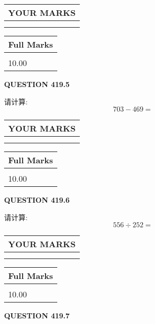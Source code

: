 \documentclass{ctexart}
\begin{document}
 
  
\vspace{0.2in}
  
\noindent\begin{tabular}{|l|}
\hline
 YOUR MARKS  \\
\hline
 \\ 
 \\ 
\hline
\end{tabular}
\hspace{0.05in} \begin{tabular}{|l|}
\hline
 Full Marks  \\
\hline
 \\ 
10.00 \\
\hline
\end{tabular}
{\textbf{\Large{QUESTION
419.5 
}}}
  
  
 
请计算:
\begin{equation}
703 -   %
469 = \nonumber
\end{equation}
 

 

 
  
\vspace{0.2in}
  
\noindent\begin{tabular}{|l|}
\hline
 YOUR MARKS  \\
\hline
 \\ 
 \\ 
\hline
\end{tabular}
\hspace{0.05in} \begin{tabular}{|l|}
\hline
 Full Marks  \\
\hline
 \\ 
10.00 \\
\hline
\end{tabular}
{\textbf{\Large{QUESTION
419.6 
}}}
  
  
 
请计算:
\begin{equation}
556  \div    %
252 = \nonumber
\end{equation}
 

 

 
  
\vspace{0.2in}
  
\noindent\begin{tabular}{|l|}
\hline
 YOUR MARKS  \\
\hline
 \\ 
 \\ 
\hline
\end{tabular}
\hspace{0.05in} \begin{tabular}{|l|}
\hline
 Full Marks  \\
\hline
 \\ 
10.00 \\
\hline
\end{tabular}
{\textbf{\Large{QUESTION
419.7 
}}}
  
\end{document}
